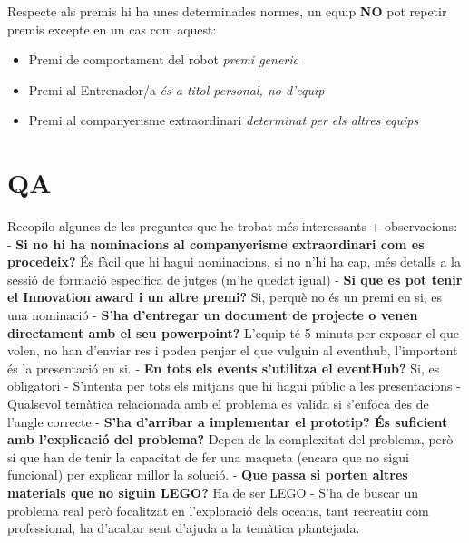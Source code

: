 \documentclass{article}
\begin{document}
Respecte als premis hi ha unes determinades normes, un equip \textbf{NO} pot repetir premis excepte en un cas com aquest:

\begin{itemize}
    \item Premi de comportament del robot \textit{premi generic}
    \item Premi al Entrenador/a \textit{és a titol personal, no d'equip}
    \item Premi al companyerisme extraordinari \textit{determinat per els altres equips}
\end{itemize}


\section{QA}

Recopilo algunes de les preguntes que he trobat més interessants + observacions:
\hfill \break\hfill \break
- \textbf{Si no hi ha nominacions al companyerisme extraordinari com es procedeix?} És fàcil que hi hagui nominacions, si no n'hi ha cap, més detalls a la sessió de formació específica de jutges (m’he quedat igual)
\hfill \break\hfill \break
- \textbf{Si que es pot tenir el Innovation award i un altre premi?} Si, perquè no és un premi en si, es una nominació
\hfill \break\hfill \break
- \textbf{S’ha d’entregar un document de projecte o venen directament amb el seu powerpoint?} L’equip té 5 minuts per exposar el que volen, no han d’enviar res i poden penjar el que vulguin al eventhub, l'important és la presentació en si.
\hfill \break\hfill \break
- \textbf{En tots els events s’utilitza el eventHub?} Si, es obligatori
\hfill \break\hfill \break
- S’intenta per tots els mitjans que hi hagui públic a les presentacions
\hfill \break\hfill \break
- Qualsevol temàtica relacionada amb el problema es valida si s’enfoca des de l’angle correcte
\hfill \break\hfill \break
- \textbf{S’ha d’arribar a implementar el prototip? És suficient amb l’explicació del problema?} Depen de la complexitat del problema, però si que han de tenir la capacitat de fer una maqueta (encara que no sigui funcional) per explicar millor la solució.
\hfill \break\hfill \break
- \textbf{Que passa si porten altres materials que no siguin LEGO?} Ha de ser LEGO
\hfill \break\hfill \break
- S’ha de buscar un problema real però focalitzat en l’exploració dels oceans, tant recreatiu com professional, ha d’acabar sent d’ajuda a la temàtica plantejada.
\end{document}

